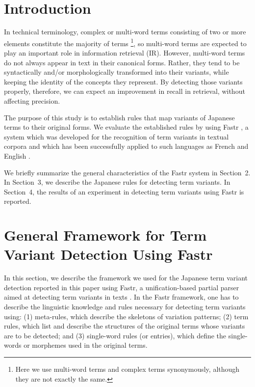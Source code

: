 \maketitle
\thispagestyle{empty}
\section{Introduction}


In technical terminology, complex or multi-word terms consisting of two or more elements constitute the majority of terms \cite{Ishii} \footnote{Here we use multi-word terms and complex terms synonymously, although they are not exactly the same.}, so multi-word terms are expected to play an important role in information retrieval (IR). However, multi-word terms do not always appear in text in their canonical forms. Rather, they tend to be syntactically and/or morphologically transformed into their variants, while keeping the identity of the concepts they represent. By detecting those variants properly, therefore, we can expect an improvement in recall in retrieval, without affecting precision.

The purpose of this study is to establish rules that map variants of Japanese terms to their original forms. We evaluate the established rules by using Fastr \cite{Jacquemin94}, a system which was developed for the recognition of term variants in textual corpora and which has been successfully applied to such languages as French and English \cite{Jacquemin96,Jacquemin97}.

We briefly summarize the general characteristics of the Fastr system in Section~2. In Section~3, we describe the Japanese rules for detecting term variants. In Section~4, the results of an experiment in detecting term variants using Fastr is reported.

\section{General Framework for Term Variant Detection Using Fastr}

In this section, we describe the framework we used for the Japanese term variant detection reported in this paper using Fastr, a unification-based partial parser aimed at detecting term variants in texts \cite{Jacquemin94}. In the Fastr framework, one has to describe the linguistic knowledge and rules necessary for detecting term variants using: (1) meta-rules, which describe the skeletons of variation patterns; (2) term rules, which list and describe the structures of the original terms whose variants are to be detected; and (3) single-word rules (or entries), which define the single-words or morphemes used in the original terms.


